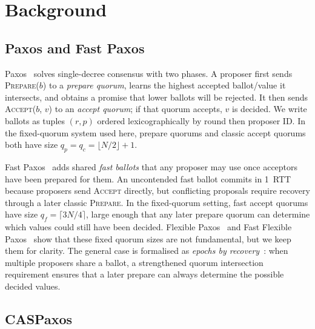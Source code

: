 \section{Background}
\label{sec:background}

\subsection{Paxos and Fast Paxos}
\label{sec:paxos-fast-paxos}

Paxos~\cite{lamport_tcs98,lamport_sigact01} solves single-decree consensus with two phases.
A proposer first sends \textsc{Prepare}($b$) to a \emph{prepare quorum}, learns the highest accepted ballot/value it intersects, and obtains a promise that lower ballots will be rejected.
It then sends \textsc{Accept}($b$, $v$) to an \emph{accept quorum}; if that quorum accepts, $v$ is decided.
We write ballots as tuples $(r, p)$ ordered lexicographically by round then proposer ID.
In the fixed-quorum system used here, prepare quorums and classic accept quorums both have size $q_p = q_c = \lfloor N/2 \rfloor + 1$.

Fast Paxos~\cite{lamport_msr05} adds shared \emph{fast ballots} that any proposer may use once acceptors have been prepared for them.
An uncontended fast ballot commits in 1~RTT because proposers send \textsc{Accept} directly, but conflicting proposals require recovery through a later classic \textsc{Prepare}.
In the fixed-quorum setting, fast accept quorums have size $q_f = \lceil 3N/4 \rceil$, large enough that any later prepare quorum can determine which values could still have been decided.
Flexible Paxos~\cite{howard_opodis16} and Fast Flexible Paxos~\cite{howard_icdcn21} show that these fixed quorum sizes are not fundamental, but we keep them for clarity.
The general case is formalised as \emph{epochs by recovery}~\cite{howard_tr19,howard_arxiv19}: when multiple proposers share a ballot, a strengthened quorum intersection requirement ensures that a later prepare can always determine the possible decided values.

\subsection{CASPaxos}
\label{sec:caspaxos}

